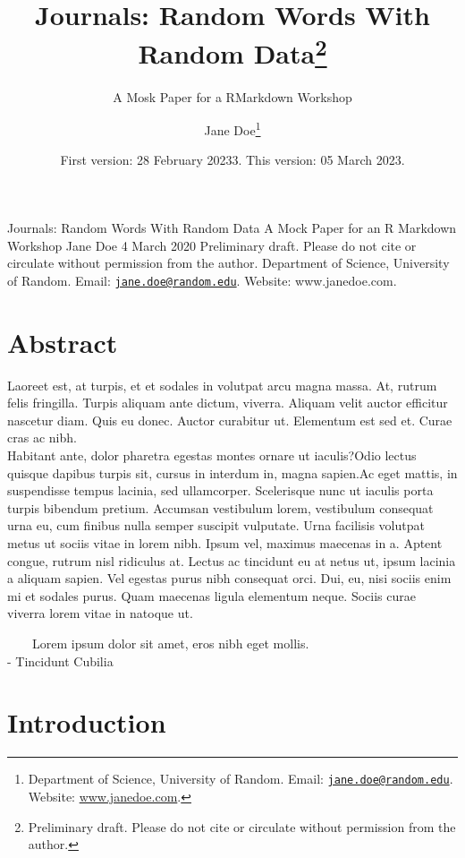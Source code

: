 \documentclass[
  12,
]{article}
\title{Journals: Random Words With Random Data\footnote{Preliminary
  draft. Please do not cite or circulate without permission from the
  author.}}
\subtitle{A Mosk Paper for a RMarkdown Workshop}
\author{Jane Doe\footnote{Department of Science, University of Random.
  Email:
  \href{mailto:jane.doe@random.edu}{\nolinkurl{jane.doe@random.edu}}.
  Website: \href{https://www.janedoe.com}{www.janedoe.com}.}}
\date{First version: 28 February 20233. This version: 05 March 2023.}
\begin{document}
\maketitle

Journals: Random Words With Random Data A Mock Paper for an R Markdown
Workshop Jane Doe 4 March 2020 Preliminary draft. Please do not cite or
circulate without permission from the author. Department of Science,
University of Random. Email:
\href{mailto:jane.doe@random.edu}{\nolinkurl{jane.doe@random.edu}}.
Website: www.janedoe.com.

\hypertarget{abstract}{%
\section*{Abstract}\label{abstract}}

Laoreet est, at turpis, et et sodales in volutpat arcu magna massa. At,
rutrum felis fringilla. Turpis aliquam ante dictum, viverra. Aliquam
velit auctor efficitur nascetur diam. Quis eu donec. Auctor curabitur
ut. Elementum est sed et. Curae cras ac nibh.\\
Habitant ante, dolor pharetra egestas montes ornare ut iaculis?Odio
lectus quisque dapibus turpis sit, cursus in interdum in, magna
sapien.Ac eget mattis, in suspendisse tempus lacinia, sed ullamcorper.
Scelerisque nunc ut iaculis porta turpis bibendum pretium. Accumsan
vestibulum lorem, vestibulum consequat urna eu, cum finibus nulla semper
suscipit vulputate. Urna facilisis volutpat metus ut sociis vitae in
lorem nibh. Ipsum vel, maximus maecenas in a. Aptent congue, rutrum nisl
ridiculus at. Lectus ac tincidunt eu at netus ut, ipsum lacinia a
aliquam sapien. Vel egestas purus nibh consequat orci. Dui, eu, nisi
sociis enim mi et sodales purus. Quam maecenas ligula elementum neque.
Sociis curae viverra lorem vitae in natoque ut.

~~~~Lorem ipsum dolor sit amet, eros nibh eget mollis.\\
\hspace*{0.333em}\hspace*{0.333em}\hspace*{0.333em}\hspace*{0.333em}-
Tincidunt Cubilia

\hypertarget{introduction}{%
\section{Introduction}\label{introduction}}
\end{document}
